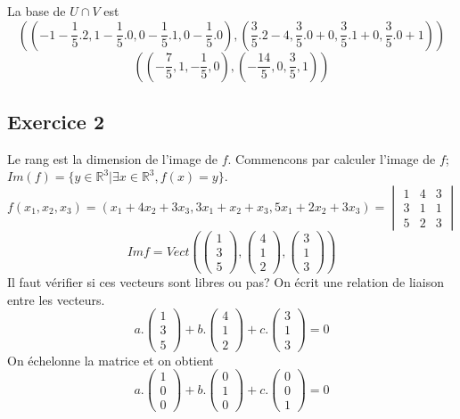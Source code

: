\documentclass[]{book}
\theoremstyle{definition}
\newcommand{\bb}[1]{\mathbb{#1}}
\newcommand{\R}{\bb{R}}
\begin{document}
La base de $U \cap V$ est 
$$((-1-\frac{1}{5}.2, 1-\frac{1}{5}.0,0-\frac{1}{5}.1,0-\frac{1}{5}.0),(\frac{3}{5}.2-4, \frac{3}{5}.0+0, \frac{3}{5}.1+0, \frac{3}{5}.0+1))$$
$$((-\frac{7}{5},1,-\frac{1}{5},0),(-\frac{14}{5}, 0, \frac{3}{5}, 1))$$  

\subsection*{Exercice 2}
Le rang est la dimension de l'image de $f$. Commencons par calculer l'image de $f$; $Im(f) = \{y \in \R^3| \exists x \in \R^3, f(x) = y\}$.
$$f(x_1, x_2, x_3) = (x_1 + 4x_2 + 3x_3, 3x_1 + x_2 + x_3, 5x_1 + 2x_2 + 3x_3) = \begin{vmatrix} 1 & 4 & 3\\ 3 &1 & 1\\5 &2 &3 \end{vmatrix}$$
$$Im f = Vect(\begin{pmatrix}1\\3\\5\end{pmatrix}, \begin{pmatrix}4\\1\\2\end{pmatrix}, \begin{pmatrix}3\\1\\3\end{pmatrix})$$
Il faut v\'erifier si ces vecteurs sont libres ou pas? On \'ecrit une relation de liaison entre les vecteurs.
$$a.\begin{pmatrix}1\\3\\5\end{pmatrix} + b.\begin{pmatrix}4\\1\\2\end{pmatrix} + c.\begin{pmatrix}3\\1\\3\end{pmatrix} = 0$$
On \'echelonne la matrice et on obtient
$$
a.\begin{pmatrix} 1 \\ 0 \\ 0 \end{pmatrix} + b.\begin{pmatrix} 0 \\ 1 \\ 0  \end{pmatrix} + c.\begin{pmatrix} 0 \\ 0 \\ 1 \end{pmatrix} = 0$$
\end{document}
